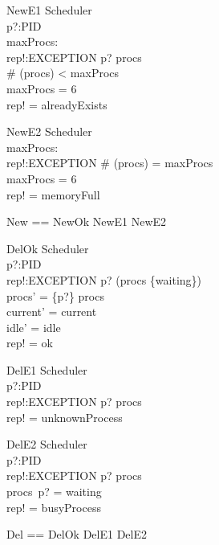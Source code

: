 \begin{schema}{NewE1}
\Xi Scheduler \\
p?:PID \\
maxProcs: \nat \\
rep!:EXCEPTION
\where
p? \in \dom procs \\
\# (\dom procs) < maxProcs \\
maxProcs = 6 \\
rep! = alreadyExists
\end{schema}

\begin{schema}{NewE2}
\Xi Scheduler \\
maxProcs: \nat \\
rep!:EXCEPTION
\where
\# (\dom procs) = maxProcs \\
maxProcs = 6 \\
rep! = memoryFull
\end{schema}

\begin{zed}
New == NewOk \lor NewE1 \lor NewE2
\end{zed}

\begin{schema}{DelOk}
\Delta Scheduler \\
p?:PID \\
rep!:EXCEPTION
\where
p? \in \dom (procs \nrres \{waiting\}) \\
procs' = \{p?\} \ndres procs \\
current' = current \\
idle' = idle \\
rep! = ok
\end{schema}

\begin{schema}{DelE1}
\Xi Scheduler \\
p?:PID \\
rep!:EXCEPTION
\where
p? \notin \dom procs \\
rep! = unknownProcess
\end{schema}

\begin{schema}{DelE2}
\Xi Scheduler \\
p?:PID \\
rep!:EXCEPTION
\where
p? \in \dom procs \\
procs~p? = waiting \\
rep! = busyProcess
\end{schema}

\begin{zed}
Del == DelOk \lor DelE1 \lor DelE2
\end{zed}

